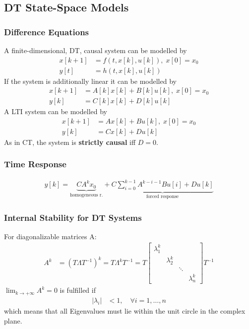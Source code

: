 \subsection{DT State-Space Models}
\subsubsection{Difference Equations}

A finite-dimensional, DT, causal system can be modelled by
\noindent\begin{align*}
    x[k+1] & =f(t,x[k],u[k]), \; x[0]=x_0 \\
    y[t]   & =h(t,x[k],u[k])
\end{align*}
If the system is additionally linear it can be modelled by
\noindent\begin{align*}
    x[k+1] & =A[k]x[k]+B[k]u[k], \; x[0]=x_0 \\
    y[k]   & =C[k]x[k]+D[k]u[k]
\end{align*}
A LTI system can be modelled by
\noindent\begin{align*}
    x[k+1] & =Ax[k]+Bu[k], \; x[0]=x_0 \\
    y[k]   & =Cx[k]+Du[k]
\end{align*}
As in CT, the system is \textbf{strictly causal} iff $D=0$.
\subsubsection{Time Response}
\noindent\begin{align*}
    y[k]=\underbrace{CA^kx_0}_{\text{homogeneous r.}} + \underbrace{C\sum_{i=0}^{k-1}A^{k-i-1}Bu[i]+Du[k]}_{\text{forced response}}
\end{align*}
\subsubsection{Internal Stability for DT Systems}

For diagonalizable matrices A:
\noindent\begin{align*}
    A^k & =(T\Lambda T^{-1})^k=T\Lambda^kT^{-1}=T\begin{bmatrix}\lambda_1^k&&&\\&\lambda_2^k&&\\&&\ddots&\\&&&\lambda_n^k\end{bmatrix}T^{-1}
\end{align*}
$\lim_{k\to+\infty}A^k=0$ is fulfilled if
\noindent\begin{align*}
    |\lambda_i| & <1,\quad\forall i=1,\ldots,n
\end{align*}
which means that all Eigenvalues must lie within the unit circle in the complex plane.\\

